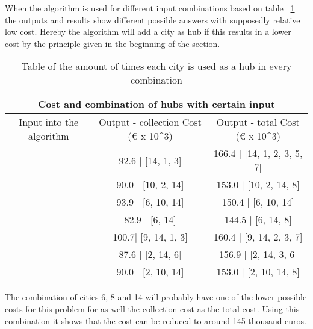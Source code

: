 \documentclass{article}
\begin{document}
            When the algorithm is used for different input combinations based on table ~\ref{amount of times hubs are used in collection} the outputs and results show different possible answers with supposedly relative low cost. Hereby the algorithm will add a city as hub if this results in a lower cost by the principle given in the beginning of the section. 
    
            \begin{table}[h!]
                \begin{center}
                    \begin{tabular}{||c|c|c||}
                        \hline
                        \multicolumn{3}{||c||}{Cost and combination of hubs with certain input} \\
                        \hline
                        \hline
                        Input into the algorithm & Output -  collection Cost (€ x 10^3) & Output - total Cost (€ x 10^3)\\
                        \hline
                        \hline
                        [14] &  92.6 | [14, 1, 3] & 166.4 | [14, 1, 2, 3, 5, 7]  \\
                        \hline
                        [10] & 90.0 | [10, 2, 14]   & 153.0 | [10, 2, 14, 8] \\
                        \hline
                        [6, 10]& 93.9 | [6, 10, 14] & 150.4 |  [6, 10, 14]\\
                        \hline
                        [6, 14] &  82.9 | [6, 14]  &  144.5 | [6, 14, 8] \\
                        \hline
                        [9, 14] &  100.7| [9, 14, 1, 3] & 160.4 |  [9, 14, 2, 3, 7] \\
                        \hline
                        [2, 14] & 87.6 | [2, 14, 6] & 156.9 |  [2, 14, 3, 6]\\
                        \hline
                        [2, 10, 14] & 90.0 | [2, 10, 14] & 153.0 | [2, 10, 14, 8]  \\
                        \hline
                    \end{tabular}
                \end{center}
            \caption{Table of the amount of times each city is used as a hub in every combination}
            \label{amount of times hubs are used in collection} 
            \end{table}
    
            The combination of cities 6, 8 and 14 will probably have one of the lower possible costs for this problem for as well the collection cost as the total cost. Using this combination it shows that the cost can be reduced to around 145 thousand euros. 
\end{document}
